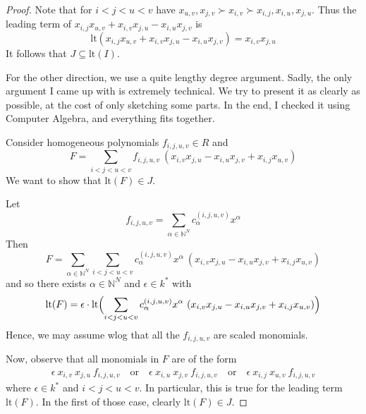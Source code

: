 \documentclass{scrartcl}
\newcommand{\N}{\mathbb{N}}
\theoremstyle{definition}
\begin{document}
\begin{proof}
    Note that for $i < j < u < v$ have $x_{u, v}, x_{j, v} \succ x_{i, v} \succ x_{i, j}, x_{i, u}, x_{j, u}$.
    Thus the leading term of $x_{i, j} x_{u, v} + x_{i, v} x_{j, u} - x_{i, u} x_{j, v}$ is
    \begin{equation*}
        \mathrm{lt}(x_{i, j} x_{u, v} + x_{i, v} x_{j, u} - x_{i, u} x_{j, v}) = x_{i, v} x_{j, u}
    \end{equation*}
    It follows that $J \subseteq \mathrm{lt}(I)$.

    For the other direction, we use a quite lengthy degree argument.
    Sadly, the only argument I came up with is extremely technical.
    We try to present it as clearly as possible, at the cost of only sketching some parts.
    In the end, I checked it using Computer Algebra, and everything fits together.

    Consider homogeneous polynomials $f_{i, j, u, v} \in R$ and
    \begin{equation*}
        F = \sum_{i < j < u < v} f_{i, j, u, v} \ (x_{i, v} x_{j, u} - x_{i, u} x_{j, v} + x_{i, j} x_{u, v})
    \end{equation*}
    We want to show that $\mathrm{lt}(F) \in J$.
    
    Let
    \begin{equation*}
        f_{i, j, u, v} = \sum_{\alpha \in \N^N} c^{(i, j, u, v)}_\alpha x^\alpha
    \end{equation*}
    Then
    \begin{equation*}
        F = \sum_{\alpha \in \N^N} \sum_{i < j < u < v} c^{(i, j, u, v)}_\alpha x^\alpha \ (x_{i, v} x_{j, u} - x_{i, u} x_{j, v} + x_{i, j} x_{u, v})
    \end{equation*}
    and so there exists $\alpha \in \N^N$ and $\epsilon \in k^*$ with
    \begin{equation*}
        \mathrm{lt}(F) = \epsilon \cdot \mathrm{lt}\Bigl( \sum_{i < j < u < v} c_\alpha^{(i, j, u, v)} x^\alpha \ (x_{i, v} x_{j, u} - x_{i, u} x_{j, v} + x_{i, j} x_{u, v}) \Bigr)
    \end{equation*}
    Hence, we may assume wlog that all the $f_{i, j, u, v}$ are scaled monomials.

    Now, observe that all monomials in $F$ are of the form
    \begin{align*}
        \epsilon \ x_{i, v} \ x_{j, u} \ f_{i, j, u, v} \quad \text{or} \quad 
        \epsilon \ x_{i, u} \ x_{j, v} \ f_{i, j, u, v} \quad \text{or} \quad 
        \epsilon \ x_{i, j} \ x_{u, v} \ f_{i, j, u, v} 
    \end{align*}
    where $\epsilon \in k^*$ and $i < j < u < v$.
    In particular, this is true for the leading term $\mathrm{lt}(F)$.
    In the first of those case, clearly $\mathrm{lt}(F) \in J$.


\end{proof}
\end{document}
